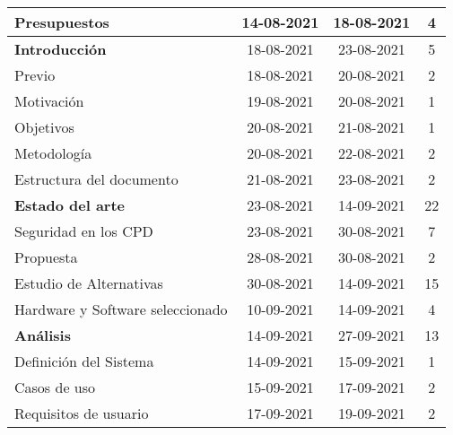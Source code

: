\begin{longtable}[c]{lcc|c|}
	\multicolumn{1}{|l|}{Presupuestos}                       & \multicolumn{1}{c|}{14-08-2021} & 18-08-2021     & 4   \\ \hline
	\multicolumn{1}{|l|}{\textbf{Introducción}}              & \multicolumn{1}{c|}{18-08-2021} & 23-08-2021     & 5   \\ \hline
	\multicolumn{1}{|l|}{Previo}                             & \multicolumn{1}{c|}{18-08-2021} & 20-08-2021     & 2   \\ \hline
	\multicolumn{1}{|l|}{Motivación}                         & \multicolumn{1}{c|}{19-08-2021} & 20-08-2021     & 1   \\ \hline
	\multicolumn{1}{|l|}{Objetivos}                          & \multicolumn{1}{c|}{20-08-2021} & 21-08-2021     & 1   \\ \hline
	\multicolumn{1}{|l|}{Metodología}                        & \multicolumn{1}{c|}{20-08-2021} & 22-08-2021     & 2   \\ \hline
	\multicolumn{1}{|l|}{Estructura del documento}           & \multicolumn{1}{c|}{21-08-2021} & 23-08-2021     & 2   \\ \hline
	\multicolumn{1}{|l|}{\textbf{Estado del arte}}           & \multicolumn{1}{c|}{23-08-2021} & 14-09-2021     & 22  \\ \hline
	\multicolumn{1}{|l|}{Seguridad en los CPD}               & \multicolumn{1}{c|}{23-08-2021} & 30-08-2021     & 7   \\ \hline
	\multicolumn{1}{|l|}{Propuesta}                          & \multicolumn{1}{c|}{28-08-2021} & 30-08-2021     & 2   \\ \hline
	\multicolumn{1}{|l|}{Estudio de Alternativas}            & \multicolumn{1}{c|}{30-08-2021} & 14-09-2021     & 15  \\ \hline
	\multicolumn{1}{|l|}{Hardware y Software   seleccionado} & \multicolumn{1}{c|}{10-09-2021} & 14-09-2021     & 4   \\ \hline
	\multicolumn{1}{|l|}{\textbf{Análisis}}                  & \multicolumn{1}{c|}{14-09-2021} & 27-09-2021     & 13  \\ \hline
	\multicolumn{1}{|l|}{Definición del Sistema}             & \multicolumn{1}{c|}{14-09-2021} & 15-09-2021     & 1   \\ \hline
	\multicolumn{1}{|l|}{Casos de uso}                       & \multicolumn{1}{c|}{15-09-2021} & 17-09-2021     & 2   \\ \hline
	\multicolumn{1}{|l|}{Requisitos de usuario}              & \multicolumn{1}{c|}{17-09-2021} & 19-09-2021     & 2   \\ \hline

\end{longtable}

